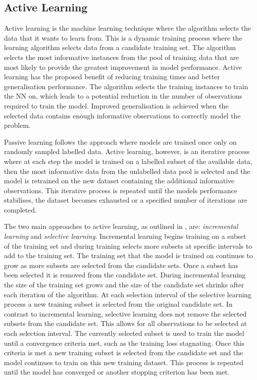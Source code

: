 \documentclass[conference]{IEEEtran}
\begin{document}
	\subsection{Active Learning}
	Active learning is the machine learning technique where the algorithm selects the data that it wants to learn from. This is a dynamic training process where the learning algorithm selects data from a candidate training set. The algorithm selects the most informative instances from the pool of training data that are most likely to provide the greatest improvement in model performance. Active learning has the proposed benefit of reducing training times and better generalisation performance. The algorithm selects the training instances to train the NN on, which leads to a potential reduction in the number of observations required to train the model. Improved generalisation is achieved when the selected data contains enough informative observations to correctly model the problem.
	
	Passive learning follows the approach where models are trained once only on randomly sampled labelled data. Active learning, however, is an iterative process where at each step the model is trained on a labelled subset of the available data, then the most informative data from the unlabelled data pool is selected and the model is retrained on the new dataset containing the additional informative observations. This iterative process is repeated until the models performance stabilises, the dataset becomes exhausted or a specified number of iterations are completed.
	
	The two main approaches to active learning, as outlined in \cite{engelbrecht2001}, are: \textit{incremental learning} and \textit{selective learning}. Incremental learning begins training on a subset of the training set and during training selects more subsets at specific intervals to add to the training set. The training set that the model is trained on continues to grow as more subsets are selected from the candidate sets. Once a subset has been selected it is removed from the candidate set. During incremental learning the size of the training set grows and the size of the candidate set shrinks after each iteration of the algorithm. At each selection interval of the selective learning process a new training subset is selected from the original candidate set. In contrast to incremental learning, selective learning does not remove the selected subsets from the candidate set. This allows for all observations to be selected at each selection interval. The currently selected subset is used to train the model until a convergence criteria met, such as the training loss stagnating. Once this criteria is met a new training subset is selected from the candidate set and the model continues to train on this new training dataset. This process is repeated until the model has converged or another stopping criterion has been met.
	
\end{document}
